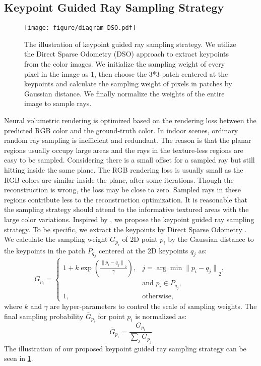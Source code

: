 \documentclass[10pt,journal,compsoc]{IEEEtran}
\begin{document}
\subsection{Keypoint Guided Ray Sampling Strategy}
\begin{figure}[htbp]
	\centering
	\texttt{[image: figure/diagram\_DSO.pdf]}
	\caption{The illustration of keypoint guided ray sampling strategy. We utilize the Direct Sparse Odometry (DSO) \cite{engel2017direct} approach to extract keypoints from the color images. We initialize the sampling weight of every pixel in the image as 1, then choose the 3*3 patch centered at the keypoints and calculate the sampling weight of pixels in patches by Gaussian distance. We finally normalize the weights of the entire image to sample rays.}
	\label{fig:diagram_dso}
\end{figure}
Neural volumetric rendering is optimized based on the rendering loss between the predicted RGB color and the ground-truth color. In indoor scenes, ordinary random ray sampling is inefficient and redundant. The reason is that the planar regions usually occupy large areas and the rays in the texture-less regions are easy to be sampled. Considering there is a small offset for a sampled ray but still hitting inside the same plane. The RGB rendering loss is usually small as the RGB colors are similar inside the plane, after some iterations. Though the reconstruction is wrong, the loss may be close to zero.
Sampled rays in these regions contribute less to the reconstruction optimization. It is reasonable that the sampling strategy should attend to the informative textured areas with the large color variations. Inspired by \cite{furukawa2009accurate,schonberger2016pixelwise,schonberger2016structure,engel2017direct,yu2020p}, we propose the keypoint guided ray sampling strategy. To be specific, we extract the keypoints by Direct Sparse Odometry \cite{engel2017direct}. We calculate the sampling weight $G_{p_i}$ of 2D point $p_i$ by the Gaussian distance to the keypoints in the patch $P_{q_j}$ centered at the 2D keypoints $q_j$ as:
\begin{equation}
	G_{p_i} = \begin{cases} 1 + k\exp(\frac{{\|p_i - q_j\|}_2}{\gamma}), &j = \arg\min{\|p_i - q_j\|}_2, \\ &\text{and } p_i\in P_{q_j},\\ 1, &\text{otherwise}, \end{cases}
	\label{eq:sampl_weight}
\end{equation}
where $k$ and $\gamma$ are hyper-parameters to control the scale of sampling weights.
The final sampling probability $\bar{G}_{p_i}$ for point $p_i$ is normalized as:
\begin{equation}
	\bar{G}_{p_i} = \frac{G_{p_i}}{\sum_{j} G_{p_j}}
\end{equation}
The illustration of our proposed keypoint guided ray sampling strategy can be seen in \cref{fig:diagram_dso}.
\end{document}
